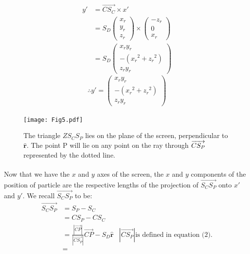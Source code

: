 \documentclass{article}
\newcommand\xp{x\prime\xspace}
\newcommand\yp{y\prime\xspace}
\begin{document}
	\begin{align*}
		\yp & = \overrightarrow{C S_C} \times \xp \\
		     & = S_D  \begin{pmatrix}x_r\\y_r\\z_r\end{pmatrix} \times \begin{pmatrix} -z_r\\ 0\\ x_r \end{pmatrix} \\
		     & = S_D \begin{pmatrix} x_r y_r \\ -\left({x_r}^2 + {z_r}^2\right) \\ z_r y_r \end{pmatrix}
	\end{align*}
	\begin{equation}
		\therefore \yp = \begin{pmatrix} x_r y_r \\ -\left({x_r}^2 + {z_r}^2\right) \\ z_r y_r \end{pmatrix}
	\end{equation}
	\paragraph{}
	
	\begin{figure}
		\centering
		\texttt{[image: Fig5.pdf]}
		\caption{The triangle $Z S_C S_P$ lies on the plane of the screen, perpendicular to $\hat{\mathbf{r}}$. The point P will lie on any point on the ray through $\protect\overrightarrow{C S_P}$ represented by the dotted line.}
	\end{figure}	

	\paragraph{}	
	Now that we have the $x$ and $y$ axes of the screen, the $x$ and $y$ components of the position of particle are the respective lengths of the projection of $\overrightarrow{S_C S_P}$ onto $\xp$ and $\yp$. 
	We recall $\overrightarrow{S_C S_P}$ to be:
	\begin{align*}
		\overrightarrow{S_C S_P} & = S_P - S_C \\
		& = C S_P - C S_C \\
		& = \frac{\left|\overrightarrow{CP}\right|}{\left|\overrightarrow{C S_P}\right|} \overrightarrow{CP} - S_D \hat{\mathbf{r}} 
			& \left|\overrightarrow{C S_P}\right| \text{is defined in equation (2).} \\
		& = 
	\end{align*}
\end{document}
